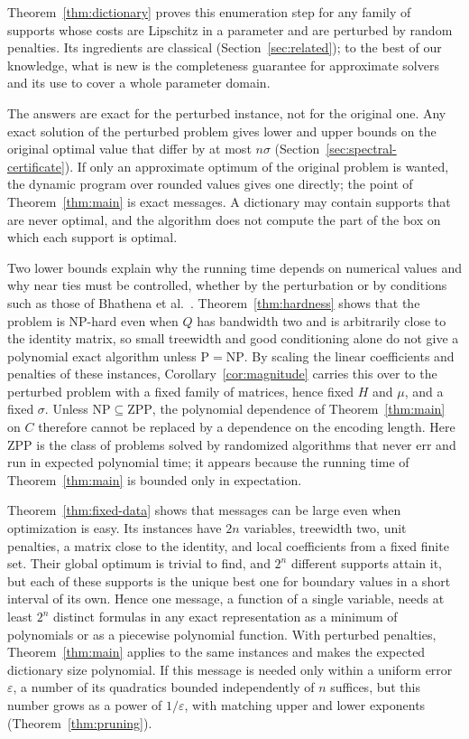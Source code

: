 Theorem~\ref{thm:dictionary} proves this enumeration step for any family
of supports whose costs are Lipschitz in a parameter and are perturbed
by random penalties. Its ingredients are classical
(Section~\ref{sec:related}); to the best of our knowledge, what is new
is the completeness guarantee for approximate solvers and its use to
cover a whole parameter domain.

The answers are exact for the perturbed instance, not for the original
one. Any exact solution of the perturbed problem gives lower and upper
bounds on the original optimal value that differ by at most $n\sigma$
(Section~\ref{sec:spectral-certificate}). If only an approximate
optimum of the original problem is wanted, the dynamic program over
rounded values gives one directly; the point of Theorem~\ref{thm:main}
is exact messages. A dictionary may contain supports that are never
optimal, and the algorithm does not compute the part of the box on which
each support is optimal.

Two lower bounds explain why the running time depends on numerical
values and why near ties must be controlled, whether by the perturbation
or by conditions such as those of
Bhathena et al.\ \cite{BhathenaStructured}.
Theorem~\ref{thm:hardness} shows that the problem is NP-hard even when
$Q$ has bandwidth two and is arbitrarily close to the identity matrix,
so small treewidth and good conditioning alone do not give a polynomial
exact algorithm unless $\mathrm{P}=\mathrm{NP}$. By scaling the linear
coefficients and penalties of these instances,
Corollary~\ref{cor:magnitude} carries this over to the perturbed problem
with a fixed family of matrices, hence fixed $H$ and $\mu$, and a fixed
$\sigma$. Unless $\mathrm{NP}\subseteq\mathrm{ZPP}$, the polynomial
dependence of Theorem~\ref{thm:main} on $C$ therefore cannot be
replaced by a dependence on the encoding length. Here ZPP is the class
of problems solved by randomized algorithms that never err and run in
expected polynomial time; it appears because the running time of
Theorem~\ref{thm:main} is bounded only in expectation.

Theorem~\ref{thm:fixed-data} shows that messages can be large even when
optimization is easy. Its instances have $2n$ variables, treewidth two,
unit penalties, a matrix close to the identity, and local coefficients
from a fixed finite set. Their global optimum is trivial to find, and
$2^n$ different supports attain it, but each of these supports is the
unique best one for boundary values in a short interval of its own.
Hence one message, a function of a single variable, needs at least
$2^n$ distinct formulas in any exact representation as a minimum of
polynomials or as a piecewise polynomial function. With perturbed
penalties, Theorem~\ref{thm:main} applies to the same instances and
makes the expected dictionary size polynomial. If this message is
needed only within a uniform error $\varepsilon$, a number of its
quadratics bounded independently of $n$ suffices, but this number grows
as a power of $1/\varepsilon$, with matching upper and lower exponents
(Theorem~\ref{thm:pruning}).

